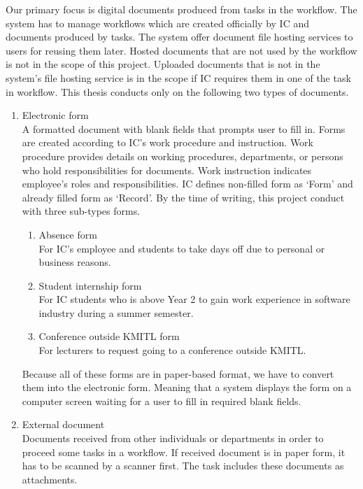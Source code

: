 Our primary focus is digital documents produced from tasks in the workflow.
The system has to manage workflows which are created officially by IC and documents produced by tasks.
The system offer document file hosting services to users for reusing them later.
Hosted documents that are not used by the workflow is not in the scope of this project.
Uploaded documents that is not in the system's file hosting service is in the scope if IC requires them in one of the task in workflow.
This thesis conducts only on the following two types of documents.
\begin{enumerate}
\item Electronic form \hfill \\
A formatted document with blank fields that prompts user to fill in.
Forms are created according to IC's work procedure and instruction.
Work procedure provides details on working procedures, departments, or persons who hold responsibilities for documents.
Work instruction indicates employee's roles and responsibilities.
IC defines non-filled form as \enquote*{Form} and already filled form as \enquote*{Record}.
By the time of writing, this project conduct with three sub-types forms.
\begin{enumerate}
\item Absence form \hfill \\
For IC's employee and students to take days off due to personal or business reasons.
\item Student internship form \hfill \\
For IC students who is above Year 2 to gain work experience in software industry during a summer semester.
\item Conference outside KMITL form \hfill \\
For lecturers to request going to a conference outside KMITL.
\end{enumerate}
Because all of these forms are in paper-based format, we have to convert them into the electronic form.
Meaning that a system displays the form on a computer screen waiting for a user to fill in required blank fields.
\item External document \hfill \\
Documents received from other individuals or departments in order to proceed some tasks in a workflow.
If received document is in paper form, it has to be scanned by a scanner first.
The task includes these documents as attachments.
\end{enumerate}

